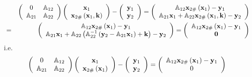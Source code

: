 \begin{eqnarray}
&&\left( 
\begin{array}{cc}
0 & {\Bbb A}_{12} \\ 
{\Bbb A}_{21} & {\Bbb A}_{22}%
\end{array}%
\right) \left( 
\begin{array}{c}
{\bf x}_{1} \\ 
{\bf x}_{2\#}\left( {\bf x}_{1},{\bf k}\right)%
\end{array}%
\right) -\left( 
\begin{array}{c}
{\bf y}_{1} \\ 
{\bf y}_{2}%
\end{array}%
\right) =\left( 
\begin{array}{c}
{\Bbb A}_{12}{\bf x}_{2\#}\left( {\bf x}_{1}\right) -{\bf y}_{1} \\ 
{\Bbb A}_{21}{\bf x}_{1}+{\Bbb A}_{22}{\bf x}_{2\#}\left( {\bf x}_{1},{\bf k}%
\right) -{\bf y}_{2}%
\end{array}%
\right)  \nonumber \\
&=&\left( 
\begin{array}{c}
{\Bbb A}_{12}{\bf x}_{2\#}\left( {\bf x}_{1}\right) -{\bf y}_{1} \\ 
{\Bbb A}_{21}{\bf x}_{1}+{\Bbb A}_{22}\left( {\Bbb A}_{22}^{-1}\left( {\bf y}%
_{2}-{\Bbb A}_{21}{\bf x}_{1}\right) +{\bf k}\right) -{\bf y}_{2}%
\end{array}%
\right) =\left( 
\begin{array}{c}
{\Bbb A}_{12}{\bf x}_{2\#}\left( {\bf x}_{1}\right) -{\bf y}_{1} \\ 
{\bf 0}%
\end{array}%
\right)
\end{eqnarray}%
i.e.%
\begin{equation}
\left( 
\begin{array}{cc}
0 & {\Bbb A}_{12} \\ 
{\Bbb A}_{21} & {\Bbb A}_{22}%
\end{array}%
\right) \left( 
\begin{array}{c}
{\bf x}_{1} \\ 
{\bf x}_{2\#}\left( {\bf x}_{1}\right)%
\end{array}%
\right) -\left( 
\begin{array}{c}
{\bf y}_{1} \\ 
{\bf y}_{2}%
\end{array}%
\right) =\left( 
\begin{array}{c}
{\Bbb A}_{12}{\bf x}_{2\#}\left( {\bf x}_{1}\right) -{\bf y}_{1} \\ 
0%
\end{array}%
\right)
\end{equation}
